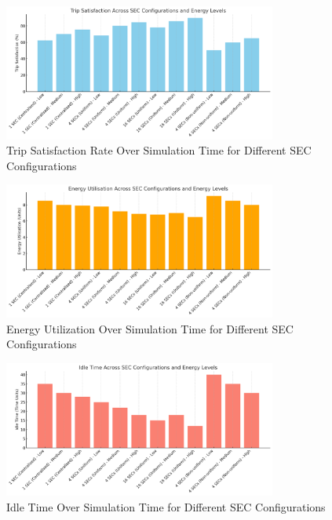 \begin{figure}[h!]
    \centering
    \includegraphics[width=0.8\textwidth]{Crest/Images/trip_satisfaction_rate.png}
    \caption{Trip Satisfaction Rate Over Simulation Time for Different SEC Configurations}
    \label{fig:trip_satisfaction_rate}
\end{figure}

\begin{figure}[h!]
    \centering
    \includegraphics[width=0.8\textwidth]{Crest/Images/energy_utilisation.png}
    \caption{Energy Utilization Over Simulation Time for Different SEC Configurations}
    \label{fig:energy_utilization}
\end{figure}

\begin{figure}[h!]
    \centering
    \includegraphics[width=0.8\textwidth]{Crest/Images/idle_time_sec_config.png}
    \caption{Idle Time Over Simulation Time for Different SEC Configurations}
    \label{fig:idle_time}
\end{figure}

